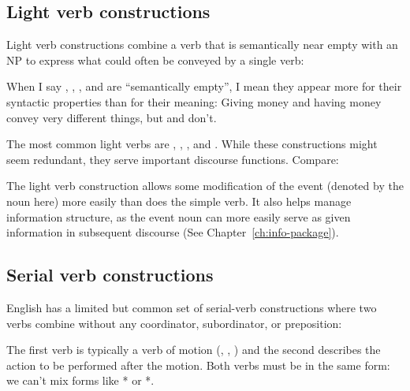 \subsection{Light verb constructions}

Light verb constructions combine a verb that is semantically near empty with an NP to express what could often be conveyed by a single verb:

\ea\label{ex:light-verb}
   \z
\z
When I say , , , and  are \enquote{semantically empty}, I mean they appear more for their syntactic properties than for their meaning: Giving money and having money convey very different things, but  and  don't. 

The most common light verbs are , , , and . While these constructions might seem redundant, they serve important discourse functions. Compare:

\ea\label{ex:light-verb-use}
   \z
\z
The light verb construction allows some modification of the event (denoted by the noun  here) more easily than does the simple verb. It also helps manage information structure, as the event noun can more easily serve as given information in subsequent discourse (See Chapter~\ref{ch:info-package}).

\subsection{Serial verb constructions} 

English has a limited but common set of serial-verb constructions where two verbs combine without any coordinator, subordinator, or preposition:

\ea\label{ex:serial}
   \z
\z
The first verb is typically a verb of motion (, , ) and the second describes the action to be performed after the motion. Both verbs must be in the same form: we can't mix forms like * or *.

